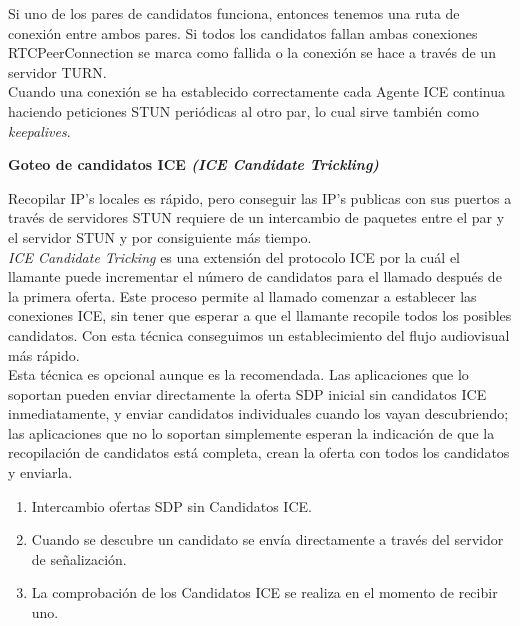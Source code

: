 Si uno de los pares de candidatos funciona, entonces tenemos una ruta de conexión entre ambos pares. Si todos los candidatos fallan ambas conexiones RTCPeerConnection se marca como fallida o la conexión se hace a través de un servidor TURN.\\

Cuando una conexión se ha establecido correctamente cada Agente ICE continua haciendo peticiones STUN periódicas al otro par, lo cual sirve también como \textit{keepalives}.\\

\begin{normalsize}
\noindent \textbf{Goteo de candidatos ICE \emph{(ICE Candidate Trickling)}}\\
\end{normalsize}

Recopilar IP's locales es rápido, pero conseguir las IP's publicas con sus puertos a través de servidores STUN requiere de un intercambio de paquetes entre el par y el servidor STUN y por consiguiente más tiempo.\\

\emph{ICE Candidate Tricking} es una extensión del protocolo ICE por la cuál el llamante puede incrementar el número de candidatos para el llamado después de la primera oferta. Este proceso permite al llamado comenzar a establecer las conexiones ICE, sin tener que esperar a que el llamante recopile todos los posibles candidatos. Con esta técnica conseguimos un establecimiento del flujo audiovisual más rápido.\\

Esta técnica es opcional aunque es la recomendada. Las aplicaciones que lo soportan pueden enviar directamente la oferta SDP inicial sin candidatos ICE inmediatamente, y enviar candidatos individuales cuando los vayan descubriendo; las aplicaciones que no lo soportan simplemente esperan la indicación de que la recopilación de candidatos está completa, crean la oferta con todos los candidatos y enviarla.\\

\begin{enumerate}
\item Intercambio ofertas SDP sin Candidatos ICE.
\item Cuando se descubre un candidato se envía directamente a través del servidor de señalización.
\item La comprobación de los Candidatos ICE se realiza en el momento de recibir uno.
\end{enumerate}

